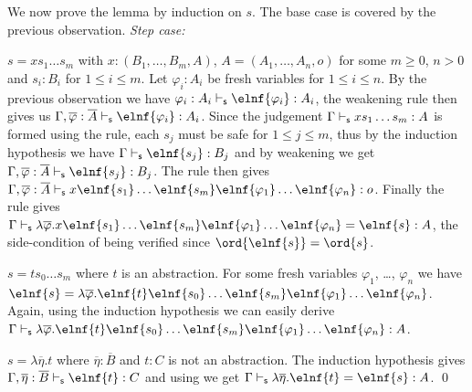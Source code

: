 We now prove the lemma by induction on $s$.
The base case is covered by the previous observation.
\emph{Step case:}
\begin{compactitem}
\item $s = x s_1 \ldots s_m$ with $x: (B_1, \ldots, B_m, A)$, $A = (A_1, \ldots, A_n, o)$ for some $m\geq 0$, $n>0$ and $s_i : B_i$ for $1 \leq i \leq
  m$.  Let $\varphi_i: A_i$ be fresh variables for $1\leq i \leq
  n$. By the previous observation we have $\varphi_i :A_i \sentail \elnf{\varphi_i} :A_i$, the weakening rule then gives us $\Gamma , \overline{\varphi} : \overline{A}
  \sentail \elnf{\varphi_i} : A_i$.  Since the judgement
  $\Gamma \vdash_{\sf s} x s_1 \ldots s_m : A$ is formed using the  rule, each $s_j$ must be safe for $1\leq j \leq m$, thus by the induction hypothesis we have $\Gamma \sentail \elnf{s_j} : B_j$ and by weakening we get $\Gamma, \overline{\varphi} :\overline{A} \sentail \elnf{s_j} : B_j$.  The 
  rule then gives $\Gamma, \overline{\varphi} :\overline{A} \sentail x \elnf{s_1} \ldots \elnf{s_m} \elnf{\varphi_1} \ldots \elnf{\varphi_n} : o$. Finally
  the  rule gives $\Gamma \sentail \lambda \overline{\varphi} . x
  \elnf{s_1} \ldots \elnf{s_m} \elnf{\varphi_1} \ldots
  \elnf{\varphi_n} = \elnf{s} : A$, the side-condition of  being verified since $\ord{\elnf{s}} = \ord{s}$.


\item $s = t s_0 \ldots s_m$ where $t$ is an abstraction.
For some fresh variables $\varphi_1$, \ldots, $\varphi_n$
we have $\elnf{s} = \lambda \overline{\varphi}. \elnf{t} \elnf{s_0} \ldots \elnf{s_m} \elnf{\varphi_1}
  \ldots \elnf{\varphi_n}$. Again, using the induction hypothesis we can easily derive $\Gamma \sentail
 \lambda \overline{\varphi}. \elnf{t} \elnf{s_0} \ldots \elnf{s_m} \elnf{\varphi_1} \ldots \elnf{\varphi_n} : A$.

\item $s = \lambda \overline{\eta} . t $ where
$\overline{\eta} : \overline{B}$ and $t:C$ is not an abstraction. The induction hypothesis gives $\Gamma,
  \overline{\eta} : \overline{B} \sentail \elnf{t} : C$ and using
 we get $\Gamma \sentail \lambda \overline{\eta} . \elnf{t} = \elnf{s} : A$.  \qed
\end{compactitem}


